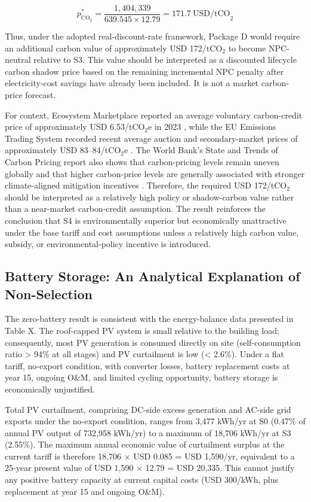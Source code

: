 \documentclass[journal,fleqn]{IEEEtran}
\begin{document}
\begin{equation}\label{eq:carbon-price-value}p^{*}_{\mathrm{CO}_{2}}=\frac{1{,}404{,}339}{639.545\times12.79}=171.7\ \mathrm{USD/tCO}_{2}\end{equation}

Thus, under the adopted real-discount-rate framework, Package D would require an additional carbon value of approximately USD 172/tCO$_{2}$ to become NPC-neutral relative to S3. This value should be interpreted as a discounted lifecycle carbon shadow price based on the remaining incremental NPC penalty after electricity-cost savings have already been included. It is not a market carbon-price forecast.


For context, Ecosystem Marketplace reported an average voluntary carbon-credit price of approximately USD 6.53/tCO$_{2}$e in 2023 \cite{ref34}, while the EU Emissions Trading System recorded recent average auction and secondary-market prices of approximately USD 83--84/tCO$_{2}$e \cite{ref35}. The World Bank's State and Trends of Carbon Pricing report also shows that carbon-pricing levels remain uneven globally and that higher carbon-price levels are generally associated with stronger climate-aligned mitigation incentives \cite{ref36}. Therefore, the required USD 172/tCO$_{2}$ should be interpreted as a relatively high policy or shadow-carbon value rather than a near-market carbon-credit assumption. The result reinforces the conclusion that S4 is environmentally superior but economically unattractive under the base tariff and cost assumptions unless a relatively high carbon value, subsidy, or environmental-policy incentive is introduced.


\subsection{Battery Storage: An Analytical Explanation of Non-Selection}

The zero-battery result is consistent with the energy-balance data presented in Table X. The roof-capped PV system is small relative to the building load; consequently, most PV generation is consumed directly on site (self-consumption ratio > 94\% at all stages) and PV curtailment is low (< 2.6\%). Under a flat tariff, no-export condition, with converter losses, battery replacement costs at year 15, ongoing O\&M, and limited cycling opportunity, battery storage is economically unjustified.


Total PV curtailment, comprising DC-side excess generation and AC-side grid exports under the no-export condition, ranges from 3,477 kWh/yr at S0 (0.47\% of annual PV output of 732,958 kWh/yr) to a maximum of 18,706 kWh/yr at S3 (2.55\%). The maximum annual economic value of curtailment surplus at the current tariff is therefore 18,706 $\times$ USD 0.085 = USD 1,590/yr, equivalent to a 25-year present value of USD 1,590 $\times$ 12.79 = USD 20,335. This cannot justify any positive battery capacity at current capital costs (USD 300/kWh, plus replacement at year 15 and ongoing O\&M).
\end{document}
